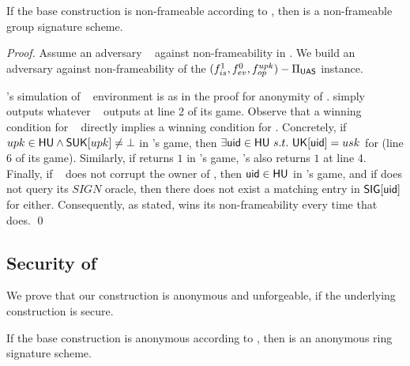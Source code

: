 \begin{theorem}
  If the base \CUASGen construction is non-frameable according to
  , then \CUASGS is a non-frameable group signature
  scheme.
\end{theorem}

\begin{proof}
  Assume an adversary \adv~ against non-frameability in \CUASGS. We build an
  adversary \advB against non-frameability of the $(f_{is}^1,f_{ev}^0,
  f_{op}^{upk})-\Pi_{\mathsf{UAS}}$ instance.

  \advB's simulation of \adv~ environment is as in the proof for anonymity
  of \CUASGS. \advB simply outputs whatever \adv~ outputs at line 2 of its
  game. Observe that a winning condition for \adv~ directly implies a winning
  condition for \advB. Concretely, if $upk \in \mathsf{HU} \land \mathsf{S}\mathsf{UK}[upk] \neq
  \bot$ in \adv's game, then $\exists \mathsf{uid} \in \mathsf{HU}~s.t.~\mathsf{UK}[\mathsf{uid}]=usk$
  for \advB (line 6 of its game). Similarly, if \Judge returns $1$ in \adv's
  game, \advB's \Judge also returns $1$ at line 4. Finally, if \adv~ does not
  corrupt the owner of \upk, then $\mathsf{uid} \in \mathsf{HU}$ in \advB's game, and if \adv
  does not query its $SIGN$ oracle, then there does not exist a matching entry
  in $\mathsf{SIG}[\mathsf{uid}]$ for \advB either. Consequently, as stated, \advB wins its
  non-frameability every time that \adv does.
  \qed
\end{proof}

\subsection{Security of \CUASRing}

We prove that our \CUASRing construction is anonymous and unforgeable, if
the underlying \CUASGen construction is secure.

\begin{theorem}
  If the base \CUASGen construction is anonymous according to
  , then \CUASRing is an anonymous ring signature
  scheme.
\end{theorem}

